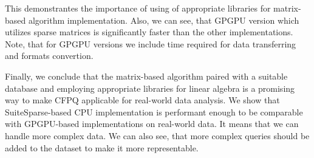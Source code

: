 
This demonstrantes the importance of using of appropriate libraries for matrix-based algorithm implementation.
Also, we can see, that GPGPU version which utilizes sparse matrices is significantly faster than the other implementations.
Note, that for GPGPU versions we include time required for data transferring and formats convertion.

Finally, we conclude that the matrix-based algorithm paired with a suitable database and employing appropriate libraries for linear algebra is a promising way to make CFPQ applicable for real-world data analysis.
We show that SuiteSparse-based CPU implementation is performant enough to be comparable with GPGPU-based implementations on real-world data.
It means that we can handle more complex data.
We can also see, that more complex queries should be added to the dataset to make it more representable.


